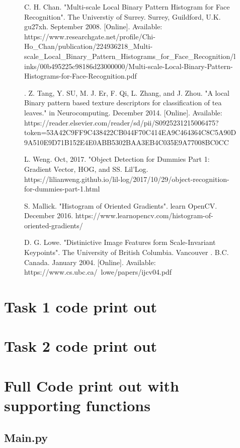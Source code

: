 \documentclass[conference]{IEEEtran}
\begin{document}
\begin{figure}[!htb]
\begin{thebibliography}{00}
 C. H. Chan. "Multi-scale Local Binary Pattern Histogram for Face Recognition". The Universtiy of Surrey. Surrey, Guildford, U.K. gu27xh. September 2008. [Online]. Available: https://www.researchgate.net/profile/Chi-Ho\_Chan/publication/224936218\_Multi-scale\_Local\_Binary\_Pattern\_Histograms\_for\_Face\_Recognition/links/00b495225c98186d23000000/Multi-scale-Local-Binary-Pattern-Histograms-for-Face-Recognition.pdf


. Z. Tang, Y. SU, M. J. Er, F. Qi, L. Zhang, and J. Zhou. "A local Binary pattern based texture descriptors for classification of tea leaves." in Neurocomputing. December 2014. [Online]. Available: https://reader.elsevier.com/reader/sd/pii/S0925231215006475?token=53A42C9FF9C438422CB044F70C414EA9C464364C8C5A90D9A510E9D71B152E4E0ABB5302BAA3EB4C035E9A77008BC0CC

 L. Weng. Oct, 2017. "Object Detection for Dummies Part 1: Gradient Vector, HOG, and SS. Lil'Log. https://lilianweng.github.io/lil-log/2017/10/29/object-recognition-for-dummies-part-1.html

 S. Mallick. "Histogram of Oriented Gradients". learn OpenCV. December 2016. https://www.learnopencv.com/histogram-of-oriented-gradients/

 D. G. Lowe. "Distinictive Image Features form Scale-Invariant Keypoints". The University of British Columbia. Vancouver . B.C. Canada. January 2004. [Online]. Available: https://www.cs.ubc.ca/~lowe/papers/ijcv04.pdf
\end{thebibliography}
\end{figure}
\appendix

\begin{appendices}
	\section{Task 1 code print out}\label{ap 1}

	\section{Task 2 code print out}
	
	\section{Full Code print out with supporting functions}
	\subsection{Main.py}
\end{appendices}

\end{document}
